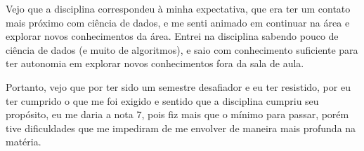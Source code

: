 \documentclass[
	10pt,
	parskip=half-,		
	paper=a4,			
	english, portuguese		
	]{scrartcl}
\begin{document}
    Vejo que a disciplina correspondeu à minha expectativa, que era ter um contato mais próximo com ciência de dados, e me senti animado em continuar na área e explorar novos conhecimentos da área. Entrei na disciplina sabendo pouco de ciência de dados (e muito de algoritmos), e saio com conhecimento suficiente para ter autonomia em explorar novos conhecimentos fora da sala de aula.
    
    Portanto, vejo que por ter sido um semestre desafiador e eu ter resistido, por eu ter cumprido o que me foi exigido e sentido que a disciplina cumpriu seu propósito, eu me daria a nota 7, pois fiz mais que o mínimo para passar, porém tive dificuldades que me impediram de me envolver de maneira mais profunda na matéria. 
\end{document}
